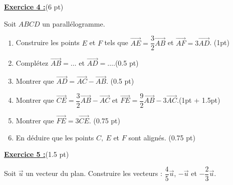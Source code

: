 \documentclass[12pt,a4paper]{article}
\begin{document}
\underline{\large\textbf{Exercice 4 :}}(6 pt)

Soit $ABCD$ un parallélogramme. 
\begin{enumerate}
	\item Construire les points $E$ et $F$ tels que $\overrightarrow{AE} = \dfrac{3}{2}\overrightarrow{AB}$ et $\overrightarrow{AF} = 3\overrightarrow{AD}$. (1pt)
	\item Complétez $\overrightarrow{AB} = \dots$ et $\overrightarrow{AD} = \dots$.(0.5 pt)
	\item Montrer que $\overrightarrow{AD} = \overrightarrow{AC} - \overrightarrow{AB}$. (0.5 pt)
	\item Montrer que $\overrightarrow{CE} = \dfrac{3}{2}\overrightarrow{AB} - \overrightarrow{AC}$ et $\overrightarrow{FE} = \dfrac{9}{2}\overrightarrow{AB} - 3\overrightarrow{AC}$.(1pt + 1.5pt)
	\item Montrer que $\overrightarrow{FE} = 3\overrightarrow{CE}$. (0.75 pt)
	\item En déduire que les points $C,\ E$ et $F$ sont alignés. (0.75 pt)
\end{enumerate}

\underline{\large\textbf{Exercice 5 :}}(1.5 pt)

Soit $\overrightarrow{u}$ un vecteur du plan. Construire les vecteurs : $\dfrac{4}{5}\overrightarrow{u}$, $-\overrightarrow{u}$ et $-\dfrac{2}{3}\overrightarrow{u}$.

\end{document}
